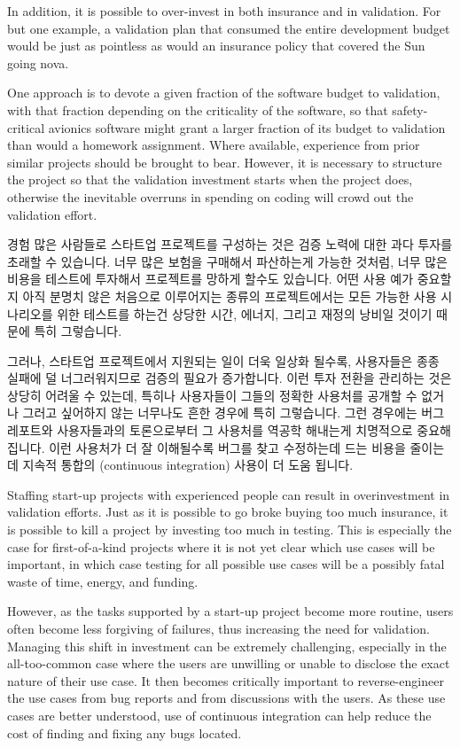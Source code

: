 In addition, it is possible to over-invest in both insurance and
in validation.
For but one example, a validation plan that consumed the entire
development budget would be just as pointless as would an insurance
policy that covered the Sun going nova.

One approach is to devote a given fraction of the software budget to
validation, with that fraction depending on the criticality of the
software, so that safety-critical avionics software might grant a
larger fraction of its budget to validation than would a homework
assignment.
Where available, experience from prior similar projects should be
brought to bear.
However, it is necessary to structure the project so that the validation
investment starts when the project does, otherwise the inevitable overruns
in spending on coding will crowd out the validation effort.

\fi

경험 많은 사람들로 스타트업 프로젝트를 구성하는 것은 검증 노력에 대한 과다
투자를 초래할 수 있습니다.
너무 많은 보험을 구매해서 파산하는게 가능한 것처럼, 너무 많은 비용을 테스트에
투자해서 프로젝트를 망하게 할수도 있습니다.
어떤 사용 예가 중요할지 아직 분명치 않은 처음으로 이루어지는 종류의
프로젝트에서는 모든 가능한 사용 시나리오를 위한 테스트를 하는건 상당한 시간,
에너지, 그리고 재정의 낭비일 것이기 때문에 특히 그렇습니다.

그러나, 스타트업 프로젝트에서 지원되는 일이 더욱 일상화 될수록, 사용자들은 종종
실패에 덜 너그러워지므로 검증의 필요가 증가합니다.
이런 투자 전환을 관리하는 것은 상당히 어려울 수 있는데, 특히나 사용자들이
그들의 정확한 사용처를 공개할 수 없거나 그러고 싶어하지 않는 너무나도 흔한
경우에 특히 그렇습니다.
그런 경우에는 버그 레포트와 사용자들과의 토론으로부터 그 사용처를 역공학
해내는게 치명적으로 중요해집니다.
이런 사용처가 더 잘 이해될수록 버그를 찾고 수정하는데 드는 비용을 줄이는데
지속적 통합의 (continuous integration) 사용이 더 도움 됩니다.

\iffalse

Staffing start-up projects with experienced people can result in
overinvestment in validation efforts.
Just as it is possible to go broke buying too much insurance, it is
possible to kill a project by investing too much in testing.
This is especially the case for first-of-a-kind projects where it is
not yet clear which use cases will be important, in which case testing
for all possible use cases will be a possibly fatal waste of time,
energy, and funding.

However, as the tasks supported by a start-up project become more routine,
users often become less forgiving of failures, thus increasing the need
for validation.
Managing this shift in investment can be extremely challenging,
especially in the all-too-common case where the users are unwilling
or unable to disclose the exact nature of their use case.
It then becomes critically important to reverse-engineer the
use cases from bug reports and from discussions with the users.
As these use cases are better understood, use of continuous integration
can help reduce the cost of finding and fixing any bugs located.

